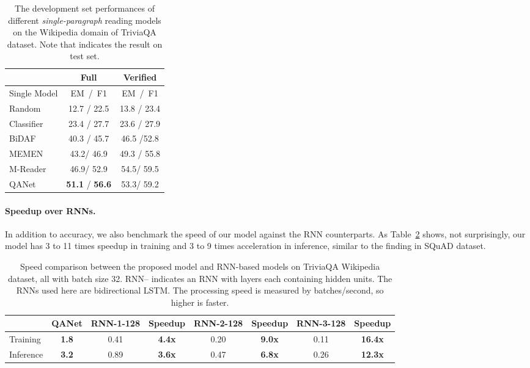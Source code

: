 \documentclass{article} \usepackage{iclr2018_conference,times}
\begin{document}
\begin{table}[ht]
\small
\begin{center}
\begin{tabular}{lcc}
\hline & Full & Verified  \\\hline
Single Model & EM~/~F1  & EM~/~F1 \\\hline
Random~\citep{JoshiCWZ17} & 12.7 / 22.5 & 13.8 / 23.4\\
Classifier~\citep{JoshiCWZ17} & 23.4 / 27.7 & 23.6 / 27.9\\
BiDAF~\citep{SeoKFH16} & 40.3 / 45.7 & 46.5 /52.8 \\
MEMEN~\citep{PanLZCCH17} & 43.2/ 46.9  & 49.3 / 55.8\\
M-Reader~\citep{HuPQ17} &  46.9/ 52.9 & 54.5/ 59.5\\
\hline
QANet & \textbf{51.1} / \textbf{56.6} &  53.3/ 59.2 \\
\hline \end{tabular}
\end{center}
\caption{The development set performances of different \textit{single-paragraph} reading models on the Wikipedia domain of TriviaQA dataset. Note that  indicates the result on test set.
}
\label{table:triviaqa_all}
\end{table}

\paragraph{Speedup over RNNs.} In addition to accuracy, we also benchmark the speed of our model against the RNN counterparts. As Table~\ref{table:triviaqa_speedup} shows, not surprisingly, our model has 3 to 11 times speedup in training and 3 to 9 times acceleration in inference, similar to the finding in SQuAD dataset.
\begin{table}[h!]
\small
\begin{center}
\begin{tabular}{l|c|cc|cc|cc}
\hline &QANet & RNN-1-128 & Speedup & RNN-2-128 & Speedup & RNN-3-128 & Speedup \\\hline
Training& \textbf{1.8} & 0.41 & \textbf{4.4x}  & 0.20 & \textbf{9.0x} & 0.11& \textbf{16.4x}\\
Inference& \textbf{3.2} & 0.89 & \textbf{3.6x}  & 0.47 & \textbf{6.8x} & 0.26 & \textbf{12.3x} 
\\\hline \end{tabular}
\end{center}
\caption{Speed comparison between the proposed model and RNN-based models on TriviaQA Wikipedia dataset, all with batch size 32. RNN-- indicates an RNN with  layers each containing  hidden units. The RNNs used here are bidirectional LSTM. The processing speed is measured by batches/second, so higher is faster.}
\label{table:triviaqa_speedup}
\end{table}
\end{document}
